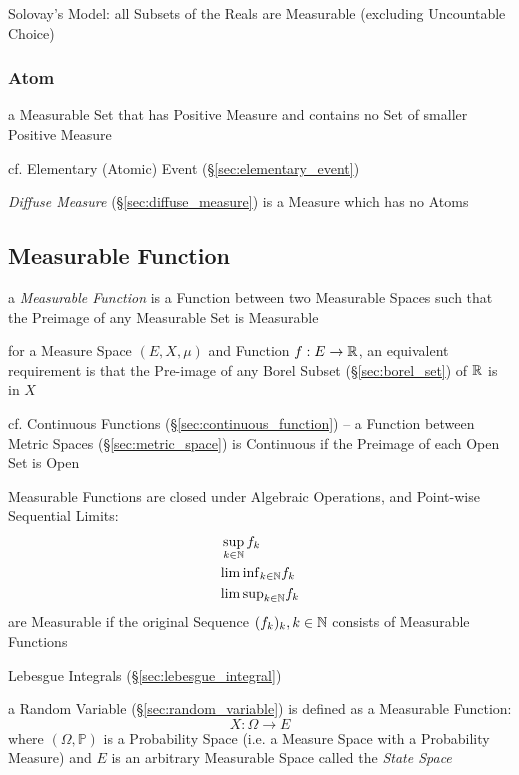 Solovay's Model: all Subsets of the Reals are Measurable (excluding Uncountable
Choice)



\subsubsection{Atom}\label{sec:atom}

a Measurable Set that has Positive Measure and contains no Set of smaller
Positive Measure

cf. Elementary (Atomic) Event (\S\ref{sec:elementary_event})

\emph{Diffuse Measure} (\S\ref{sec:diffuse_measure}) is a Measure which has no
Atoms



\subsection{Measurable Function}\label{sec:measurable_function}

a \emph{Measurable Function} is a Function between two Measurable Spaces such
that the Preimage of any Measurable Set is Measurable

for a Measure Space $(E, X, \mu)$ and Function $f : E \rightarrow \mathbb{R}$, an
equivalent requirement is that the Pre-image of any Borel Subset
(\S\ref{sec:borel_set}) of $\mathbb{R}$ is in $X$

\fist cf. Continuous Functions (\S\ref{sec:continuous_function}) -- a Function
between Metric Spaces (\S\ref{sec:metric_space}) is Continuous if the Preimage
of each Open Set is Open

Measurable Functions are closed under Algebraic Operations, and Point-wise
Sequential Limits:
\begin{align*}
  & \sup_{k\in\mathbb{N}} f_k \\
  & {\lim \inf}_{k\in\mathbb{N}} f_k \\
  & {\lim \sup}_{k\in\mathbb{N}} f_k \\
\end{align*}
are Measurable if the original Sequence $(f_k)_k, k \in \mathbb{N}$ consists of
Measurable Functions

\fist Lebesgue Integrals (\S\ref{sec:lebesgue_integral})

a Random Variable (\S\ref{sec:random_variable}) is defined as a Measurable
Function:
\[
  X : \Omega \rightarrow E
\]
where $(\Omega,\mathbb{P})$ is a Probability Space (i.e. a Measure Space with a
Probability Measure) and $E$ is an arbitrary Measurable Space called the
\emph{State Space}


